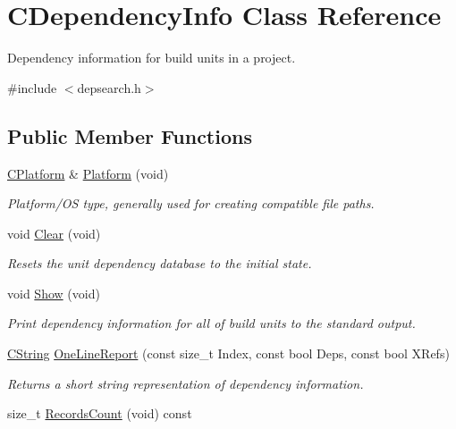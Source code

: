 \hypertarget{classCDependencyInfo}{\section{C\-Dependency\-Info Class Reference}
\label{classCDependencyInfo}
}


Dependency information for build units in a project.  




{\ttfamily \#include $<$depsearch.\-h$>$}

\subsection*{Public Member Functions}
\begin{DoxyCompactItemize}
\item 
\hyperlink{classCPlatform}{C\-Platform} \& \hyperlink{classCDependencyInfo_ae94f6374ec681801cc8304ad3e8a4f5e}{Platform} (void)
\begin{DoxyCompactList}\small\item\em Platform/\-O\-S type, generally used for creating compatible file paths. \end{DoxyCompactList}\item 
void \hyperlink{classCDependencyInfo_a900762f097ed041faa74613da4ea62c2}{Clear} (void)
\begin{DoxyCompactList}\small\item\em Resets the unit dependency database to the initial state. \end{DoxyCompactList}\item 
void \hyperlink{classCDependencyInfo_a946c31a0b7bef21a5793e6b134978912}{Show} (void)
\begin{DoxyCompactList}\small\item\em Print dependency information for all of build units to the standard output. \end{DoxyCompactList}\item 
\hyperlink{classCString}{C\-String} \hyperlink{classCDependencyInfo_ac2e36edc053c52d6fa9da19ef293e24b}{One\-Line\-Report} (const size\-\_\-t Index, const bool Deps, const bool X\-Refs)
\begin{DoxyCompactList}\small\item\em Returns a short string representation of dependency information. \end{DoxyCompactList}\item 
size\-\_\-t \hyperlink{classCDependencyInfo_a844740f473781d070df0f41d0762eb2f}{Records\-Count} (void) const 

\end{DoxyCompactItemize}
